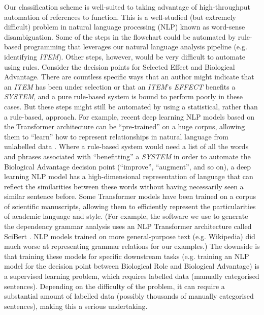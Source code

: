 \documentclass{article}
\begin{document}
Our classification scheme is well-suited to taking advantage of high-throughput automation of references to function.
This is a well-studied (but extremely difficult) problem in natural language processing (NLP) known as word-sense disambiguation.
Some of the steps in the flowchart could be automated by rule-based programming that leverages our natural language analysis pipeline (e.g. identifying \emph{ITEM}).
Other steps, however, would be very difficult to automate using rules.
Consider the decision points for Selected Effect and Biological Advantage.
There are countless specific ways that an author might indicate that an \emph{ITEM} has been under selection or that an \emph{ITEM}'s \emph{EFFECT} benefits a \emph{SYSTEM}, and a pure rule-based system is bound to perform poorly in these cases.
But these steps might still be automated by using a statistical, rather than a rule-based, approach.
For example, recent deep learning NLP models based on the Transformer architecture can be ``pre-trained'' on a huge corpus, allowing them to ``learn'' how to represent relationships in natural language from unlabelled data \cite{devlin2019} .
Where a rule-based system would need a list of all the words and phrases associated with ``benefitting'' a \emph{SYSTEM} in order to automate the Biological Advantage decision point (``improve'', ``augment'', and so on), a deep learning NLP model has a high-dimensional representation of language that can reflect the similarities between these words without having necessarily seen a similar sentence before.
Some Transformer models have been trained on a corpus of scientific manuscripts, allowing them to efficiently represent the particularities of academic language and style.
(For example, the software we use to generate the dependency grammar analysis uses an NLP Transformer architecture called SciBert \cite{scispacy}. NLP models trained on more general-purpose text (e.g. Wikipedia) did much worse at representing grammar relations for our examples.)
The downside is that training these models for specific downstream tasks (e.g. training an NLP model for the decision point between Biological Role and Biological Advantage) is a supervised learning problem, which requires labelled data (manually categorised sentences).
Depending on the difficulty of the problem, it can require a substantial amount of labelled data (possibly thousands of manually categorised sentences), making this a serious undertaking.
\end{document}
